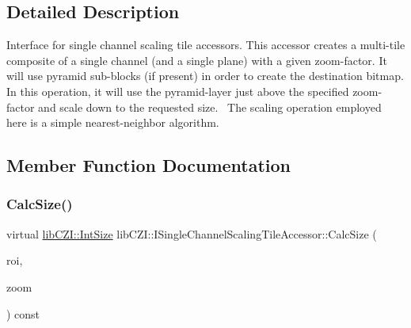 \subsection{Detailed Description}
Interface for single channel scaling tile accessors. This accessor creates a multi-\/tile composite of a single channel (and a single plane) with a given zoom-\/factor. It will use pyramid sub-\/blocks (if present) in order to create the destination bitmap. In this operation, it will use the pyramid-\/layer just above the specified zoom-\/factor and scale down to the requested size.~\newline
The scaling operation employed here is a simple nearest-\/neighbor algorithm. 

\subsection{Member Function Documentation}
\mbox{\label{classlib_c_z_i_1_1_i_single_channel_scaling_tile_accessor_aa7a0c9edcdd3460471edfdbe54fc2f76}} 
\subsubsection{\texorpdfstring{Calc\+Size()}{CalcSize()}}
{\footnotesize\ttfamily virtual \hyperlink{structlib_c_z_i_1_1_int_size}{lib\+C\+Z\+I\+::\+Int\+Size} lib\+C\+Z\+I\+::\+I\+Single\+Channel\+Scaling\+Tile\+Accessor\+::\+Calc\+Size (\begin{DoxyParamCaption}\item[{const \hyperlink{structlib_c_z_i_1_1_int_rect}{lib\+C\+Z\+I\+::\+Int\+Rect} \&}]{roi,  }\item[{float}]{zoom }\end{DoxyParamCaption}) const\hspace{0.3cm}{\ttfamily [pure virtual]}}

